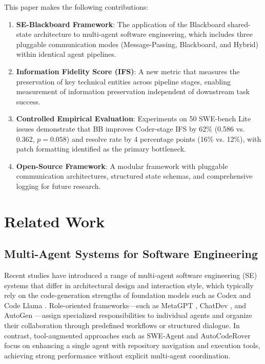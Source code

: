 \documentclass{ieeeaccess}
\begin{document}
This paper makes the following contributions:

\begin{enumerate}
\item \textbf{SE-Blackboard Framework}: The application of the Blackboard shared-state architecture to multi-agent software engineering, which includes three pluggable communication modes (Message-Passing, Blackboard, and Hybrid) within identical agent pipelines.

\item \textbf{Information Fidelity Score (IFS)}: A new metric that measures the preservation of key technical entities across pipeline stages, enabling measurement of information preservation independent of downstream task success.

\item \textbf{Controlled Empirical Evaluation}: Experiments on 50 SWE-bench Lite issues demonstrate that BB improves Coder-stage IFS by 62\% (0.586 vs. 0.362, $p=0.058$) and resolve rate by 4 percentage points (16\% vs. 12\%), with patch formatting identified as the primary bottleneck.

\item \textbf{Open-Source Framework}: A modular framework with pluggable communication architectures, structured state schemas, and comprehensive logging for future research.

\end{enumerate}
\section{Related Work}

\subsection{Multi-Agent Systems for Software Engineering}

Recent studies have introduced a range of multi-agent software engineering (SE) systems that differ in architectural design and interaction style, which typically rely on the code-generation strengths of foundation models such as Codex \cite{chen2021evaluating} and Code Llama \cite{roziere2023code}. Role-oriented frameworks---such as MetaGPT \cite{hong2024metagpt}, ChatDev \cite{qian2024chatdev}, and AutoGen \cite{wu2023autogen}---assign specialized responsibilities to individual agents and organize their collaboration through predefined workflows or structured dialogue. In contrast, tool-augmented approaches such as SWE-Agent \cite{yang2024sweagent} and AutoCodeRover \cite{zhang2024autocoderover} focus on enhancing a single agent with repository navigation and execution tools, achieving strong performance without explicit multi-agent coordination.
\end{document}
